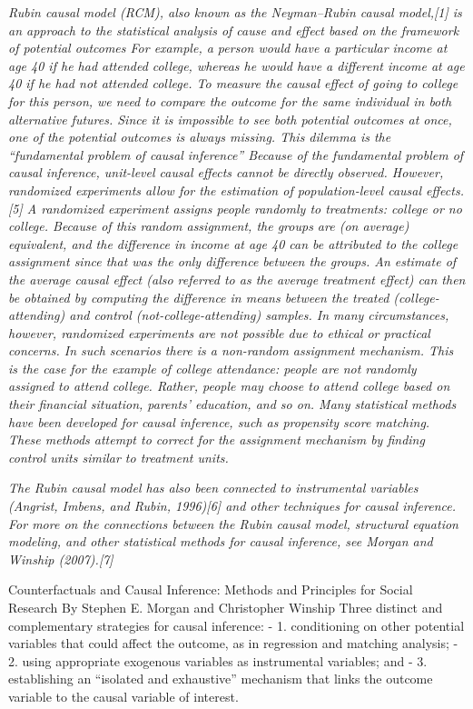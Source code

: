 \documentclass[
  11pt,
]{book}
\begin{document}
\emph{Rubin causal model (RCM), also known as the Neyman--Rubin causal model,{[}1{]} is an approach to the statistical analysis of cause and effect based on the framework of potential outcomes For example, a person would have a particular income at age 40 if he had attended college, whereas he would have a different income at age 40 if he had not attended college. To measure the causal effect of going to college for this person, we need to compare the outcome for the same individual in both alternative futures. Since it is impossible to see both potential outcomes at once, one of the potential outcomes is always missing. This dilemma is the ``fundamental problem of causal inference'' Because of the fundamental problem of causal inference, unit-level causal effects cannot be directly observed. However, randomized experiments allow for the estimation of population-level causal effects.{[}5{]} A randomized experiment assigns people randomly to treatments: college or no college. Because of this random assignment, the groups are (on average) equivalent, and the difference in income at age 40 can be attributed to the college assignment since that was the only difference between the groups. An estimate of the average causal effect (also referred to as the average treatment effect) can then be obtained by computing the difference in means between the treated (college-attending) and control (not-college-attending) samples. In many circumstances, however, randomized experiments are not possible due to ethical or practical concerns. In such scenarios there is a non-random assignment mechanism. This is the case for the example of college attendance: people are not randomly assigned to attend college. Rather, people may choose to attend college based on their financial situation, parents' education, and so on. Many statistical methods have been developed for causal inference, such as propensity score matching. These methods attempt to correct for the assignment mechanism by finding control units similar to treatment units.}

\emph{The Rubin causal model has also been connected to instrumental variables (Angrist, Imbens, and Rubin, 1996){[}6{]} and other techniques for causal inference. For more on the connections between the Rubin causal model, structural equation modeling, and other statistical methods for causal inference, see Morgan and Winship (2007).{[}7{]}}

Counterfactuals and Causal Inference: Methods and Principles for Social Research By Stephen E. Morgan and Christopher Winship
Three distinct and complementary strategies for causal inference:
- 1. conditioning on other potential variables that could affect the outcome, as in regression and matching analysis;
- 2. using appropriate exogenous variables as instrumental variables; and
- 3. establishing an ``isolated and exhaustive'' mechanism that links the outcome variable to the causal variable of interest.
\end{document}
